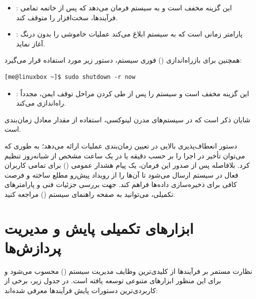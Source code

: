 \begin{itemize}
  \item {}: این گزینه مخفف  است و به سیستم فرمان می‌دهد که پس از خاتمه تمامی فرآیندها، سخت‌افزار را متوقف کند.
  \item {}: پارامتر زمانی است که به سیستم ابلاغ می‌کند عملیات خاموشی را بدون درنگ آغاز نماید.
\end{itemize}

همچنین برای بازراه‌اندازی () فوری سیستم، دستور زیر مورد استفاده قرار می‌گیرد:

\begin{latin}
\begin{lstlisting}
[me@linuxbox ~]$ sudo shutdown -r now
\end{lstlisting}
\end{latin}

\begin{itemize}
  \item {}: این گزینه مخفف  است و سیستم را پس از طی کردن مراحل توقف ایمن، مجدداً راه‌اندازی می‌کند.
\end{itemize}

شایان ذکر است که در سیستم‌های مدرن لینوکسی، استفاده از مقدار  معادل زمان‌بندی  است.

دستور  انعطاف‌پذیری بالایی در تعیین زمان‌بندی عملیات ارائه می‌دهد؛ به طوری که می‌توان تأخیر در اجرا را بر حسب دقیقه یا در یک ساعت مشخص از شبانه‌روز تنظیم کرد. بلافاصله پس از صدور این فرمان، یک پیام هشدار عمومی () برای تمامی کاربران فعال در سیستم ارسال می‌شود تا آن‌ها را از رویداد پیش‌رو مطلع ساخته و فرصت کافی برای ذخیره‌سازی داده‌ها فراهم کند. جهت بررسی جزئیات فنی و پارامترهای تکمیلی، می‌توانید به صفحه راهنمای سیستم () مراجعه کنید.

\section{ابزارهای تکمیلی پایش و مدیریت پردازش‌ها}

نظارت مستمر بر فرآیندها از کلیدی‌ترین وظایف مدیریت سیستم () محسوب می‌شود و برای این منظور ابزارهای متنوعی توسعه یافته است. در جدول زیر، برخی از کاربردی‌ترین دستورات پایش فرآیندها معرفی شده‌اند:


